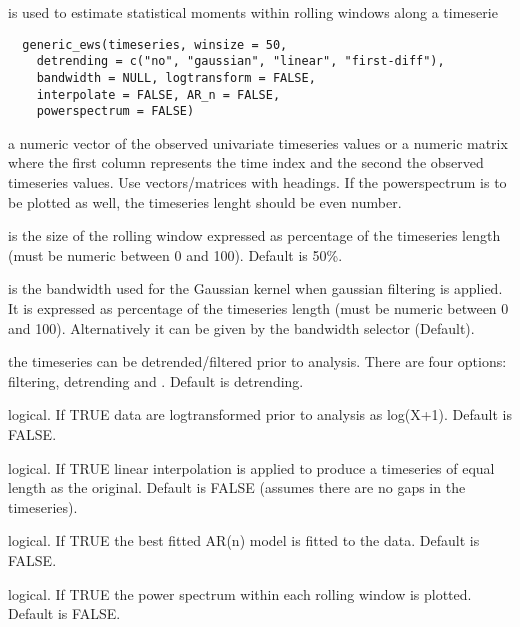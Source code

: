 \documentclass[a4paper]{book}
\begin{document}
%
\begin{Description}\relax
{} is used to estimate statistical
moments within rolling windows along a timeserie
\end{Description}
%
\begin{Usage}
\begin{verbatim}
  generic_ews(timeseries, winsize = 50,
    detrending = c("no", "gaussian", "linear", "first-diff"),
    bandwidth = NULL, logtransform = FALSE,
    interpolate = FALSE, AR_n = FALSE,
    powerspectrum = FALSE)
\end{verbatim}
\end{Usage}
%
\begin{Arguments}
\begin{ldescription}
\item[\code{timeseries}] a numeric vector of the observed
univariate timeseries values or a numeric matrix where
the first column represents the time index and the second
the observed timeseries values. Use vectors/matrices with
headings. If the powerspectrum is to be plotted as well,
the timeseries lenght should be even number.

\item[\code{winsize}] is the size of the rolling window
expressed as percentage of the timeseries length (must be
numeric between 0 and 100). Default is 50\%.

\item[\code{bandwidth}] is the bandwidth used for the Gaussian
kernel when gaussian filtering is applied. It is
expressed as percentage of the timeseries length (must be
numeric between 0 and 100). Alternatively it can be given
by the bandwidth selector 
(Default).

\item[\code{detrending}] the timeseries can be
detrended/filtered prior to analysis. There are four
options:  filtering, 
detrending and . Default is
 detrending.

\item[\code{logtransform}] logical. If TRUE data are
logtransformed prior to analysis as log(X+1). Default is
FALSE.

\item[\code{interpolate}] logical. If TRUE linear interpolation
is applied to produce a timeseries of equal length as the
original. Default is FALSE (assumes there are no gaps in
the timeseries).

\item[\code{AR\_n}] logical. If TRUE the best fitted AR(n) model
is fitted to the data. Default is FALSE.

\item[\code{powerspectrum}] logical. If TRUE the power spectrum
within each rolling window is plotted. Default is FALSE.
\end{ldescription}
\end{Arguments}
\end{document}
